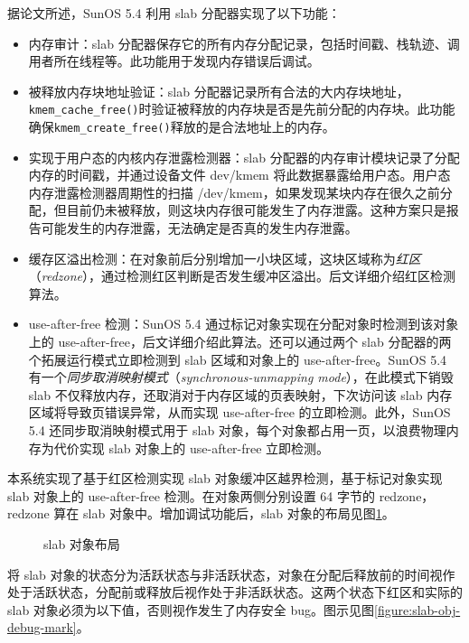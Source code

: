 \documentclass[AutoFakeBold]{LZUThesis}
\begin{document}
\begin{sloppypar}
据论文\cite{bonwick1994slab}所述，SunOS 5.4 利用 slab 分配器实现了以下功能：

\begin{itemize}
\item
  内存审计：slab
  分配器保存它的所有内存分配记录，包括时间戳、栈轨迹、调用者所在线程等。此功能用于发现内存错误后调试。
\item
  被释放内存块地址验证：slab
  分配器记录所有合法的大内存块地址，\texttt{kmem\_cache\_free()}时验证被释放的内存块是否是先前分配的内存块。此功能确保\texttt{kmem\_create\_free()}释放的是合法地址上的内存。
\item
  实现于用户态的内核内存泄露检测器：slab
  分配器的内存审计模块记录了分配内存的时间戳，并通过设备文件 dev/kmem
  将此数据暴露给用户态。用户态内存泄露检测器周期性的扫描
  /dev/kmem，如果发现某块内存在很久之前分配，但目前仍未被释放，则这块内存很可能发生了内存泄露。这种方案只是报告可能发生的内存泄露，无法确定是否真的发生内存泄露。
\item
  缓存区溢出检测：在对象前后分别增加一小块区域，这块区域称为\emph{红区}（\emph{redzone}），通过检测红区判断是否发生缓冲区溢出。后文详细介绍红区检测算法。
\item
  use-after-free 检测：SunOS 5.4
  通过标记对象实现在分配对象时检测到该对象上的
  use-after-free，后文详细介绍此算法。还可以通过两个 slab
  分配器的两个拓展运行模式立即检测到 slab 区域和对象上的
  use-after-free。SunOS 5.4
  有一个\emph{同步取消映射模式}（\emph{synchronous-unmapping
  mode}），在此模式下销毁 slab
  不仅释放内存，还取消对于内存区域的页表映射，下次访问该 slab
  内存区域将导致页错误异常，从而实现 use-after-free
  的立即检测。此外，SunOS 5.4 还同步取消映射模式用于 slab
  对象，每个对象都占用一页，以浪费物理内存为代价实现 slab 对象上的
  use-after-free 立即检测。
\end{itemize}

本系统实现了基于红区检测实现 slab 对象缓冲区越界检测，基于标记对象实现
slab 对象上的 use-after-free 检测。在对象两侧分别设置 64 字节的
redzone，redzone 算在 slab 对象中。增加调试功能后，slab 对象的布局见图\ref{figure:slab-debug-layout}。

\begin{figure}
\centering

\caption{slab 对象布局}
\label{figure:slab-debug-layout}
\end{figure}

将 slab
对象的状态分为活跃状态与非活跃状态，对象在分配后释放前的时间视作处于活跃状态，分配前或释放后视作处于非活跃状态。这两个状态下红区和实际的
slab 对象必须为以下值，否则视作发生了内存安全 bug。图示见图\ref{figure:slab-obj-debug-mark}。


\end{sloppypar}
\end{document}
